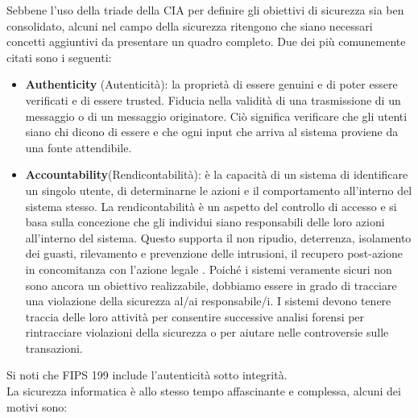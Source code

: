 Sebbene l'uso della triade della CIA per definire gli obiettivi di sicurezza sia ben consolidato,
alcuni nel campo della sicurezza ritengono che siano necessari concetti aggiuntivi da presentare
un quadro completo. Due dei più comunemente citati sono i seguenti:
\begin{itemize}
    \item \textbf{Authenticity} (Autenticità): la proprietà di essere genuini e di poter essere verificati e di essere trusted. Fiducia nella validità di una trasmissione di un messaggio o di un messaggio originatore. Ciò significa verificare che gli utenti siano chi dicono di essere e che ogni input che arriva al sistema proviene da una fonte attendibile.
    \item \textbf{Accountability}(Rendicontabilità): è la capacità di un sistema di identificare un singolo utente, di determinarne le azioni e il comportamento all'interno del sistema stesso. La rendicontabilità è un aspetto del controllo di accesso e si basa sulla concezione che gli individui siano responsabili delle loro azioni all'interno del sistema. Questo supporta il non ripudio, deterrenza, isolamento dei guasti, rilevamento e prevenzione delle intrusioni, il recupero post-azione in concomitanza con l'azione legale . Poiché i sistemi veramente sicuri non sono ancora un obiettivo realizzabile, dobbiamo essere in grado di tracciare una violazione della sicurezza al/ai responsabile/i. I sistemi devono tenere traccia delle loro attività per consentire successive analisi forensi per rintracciare violazioni della sicurezza o per aiutare nelle controversie sulle transazioni.
\end{itemize}
Si noti che FIPS 199 include l'autenticità sotto integrità.
\\
La sicurezza informatica è allo stesso tempo affascinante e complessa, alcuni dei motivi sono:
